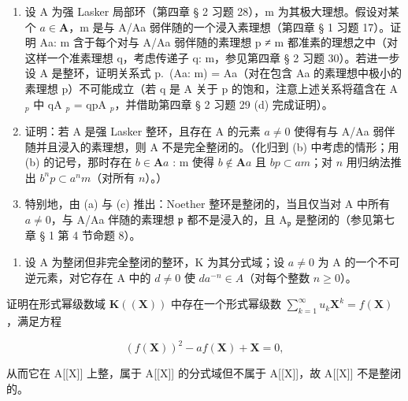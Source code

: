 \begin{enumerate}
\def\labelenumi{(\alph{enumi})}
\setcounter{enumi}{1}
\item
  设 A 为强 Lasker 局部环（第四章 § 2 习题 28），m 为其极大理想。假设对某个 \(a \in \mathbf{A}\)，m 是与 A/Aa 弱伴随的一个浸入素理想（第四章 § 1 习题 17）。证明 Aa: m 含于每个对与 A/Aa 弱伴随的素理想 p ≠ m 都准素的理想之中（对这样一个准素理想 q，考虑传递子 q: m，参见第四章 § 2 习题 30）。若进一步设 A 是整环，证明关系式 p.~(Aa: m) = Aa（对在包含 Aa 的素理想中极小的素理想 p）不可能成立（若 q 是 A 关于 p 的饱和，注意上述关系将蕴含在 A \(_{p}\) 中 qA \(_{p}\) = qpA \(_{p}\)，并借助第四章 § 2 习题 29 (d) 完成证明）。
\item
  证明：若 A 是强 Lasker 整环，且存在 A 的元素 \(a \neq 0\) 使得有与 A/Aa 弱伴随并且浸入的素理想，则 A 不是完全整闭的。（化归到 (b) 中考虑的情形；用 (b) 的记号，那时存在 \(b \in \mathbf{A}a\) : m 使得 \(b \notin \mathbf{A}a\) 且 \(bp \subset am\)；对 \(n\) 用归纳法推出 \(b^n p \subset a^n m\)（对所有 \(n\)）。）
\item
  特别地，由 (a) 与 (c) 推出：Noether 整环是整闭的，当且仅当对 A 中所有 \(a \neq 0\)，与 A/Aa 伴随的素理想 \(\mathfrak{p}\) 都不是浸入的，且 \(\mathrm{A}_{\mathfrak{p}}\) 是整闭的（参见第七章 § 1 第 4 节命题 8）。
\end{enumerate}

\begin{enumerate}
\def\labelenumi{\arabic{enumi}.}
\setcounter{enumi}{26}
\tightlist
\item
  设 A 为整闭但非完全整闭的整环，K 为其分式域；设 \(a \neq 0\) 为 A 的一个不可逆元素，对它存在 A 中的 \(d \neq 0\) 使 \(da^{-n} \in A\)（对每个整数 \(n \geqslant 0\)）。
\end{enumerate}

证明在形式幂级数域 \(\mathbf{K}((\mathbf{X}))\) 中存在一个形式幂级数 \(\sum_{k=1}^{\infty} u_k \mathbf{X}^k = f(\mathbf{X})\)，满足方程

\[
(f (\mathbf {X})) ^ {2} - a f (\mathbf {X}) + \mathbf {X} = 0,
\]

从而它在 A{[}{[}X{]}{]} 上整，属于 A{[}{[}X{]}{]} 的分式域但不属于 A{[}{[}X{]}{]}，故 A{[}{[}X{]}{]} 不是整闭的。

